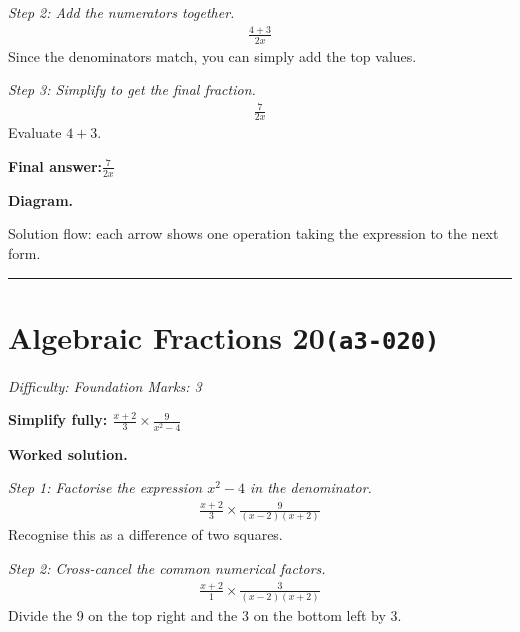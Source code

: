 \documentclass[11pt]{article}
\newcommand{\question}[1]{\par\medskip\noindent\textbf{#1}\par}
\begin{document}
\textit{Step 2: Add the numerators together.}
\[\begin{gathered}
\frac{4 + 3}{2x}
\end{gathered}\]
Since the denominators match, you can simply add the top values.

\textit{Step 3: Simplify to get the final fraction.}
\[\begin{gathered}
\frac{7}{2x}
\end{gathered}\]
Evaluate \( 4 + 3 \).

\begin{answerbox}
\textbf{Final answer:}\quad \(\displaystyle \frac{7}{2x}\)
\end{answerbox}
\textbf{Diagram.}

\begin{center}
\end{center}
\small Solution flow: each arrow shows one operation taking the expression to the next form.\normalsize

\medskip\hrule

\section*{Algebraic Fractions 20\quad\small\texttt{(a3-020)}}
\textit{Difficulty: Foundation \quad\textbar\quad Marks: 3}

\question{Simplify fully: \( \frac{x+2}{3} \times \frac{9}{x^2 - 4} \)}

\textbf{Worked solution.}

\textit{Step 1: Factorise the expression \( x^2 - 4 \) in the denominator.}
\[\begin{gathered}
\frac{x+2}{3} \times \frac{9}{(x-2)(x+2)}
\end{gathered}\]
Recognise this as a difference of two squares.

\textit{Step 2: Cross-cancel the common numerical factors.}
\[\begin{gathered}
\frac{x+2}{1} \times \frac{3}{(x-2)(x+2)}
\end{gathered}\]
Divide the 9 on the top right and the 3 on the bottom left by 3.
\end{document}
